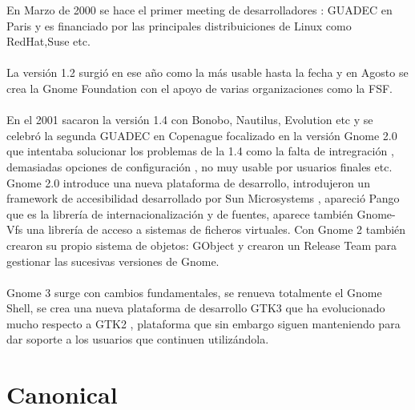 \documentclass[a4paper,oneside,11pt]{article}
\begin{document}
En Marzo de 2000 se hace el primer meeting de desarrolladores : GUADEC en Paris y
es financiado por las principales distribuiciones de Linux como RedHat,Suse etc.
\\\\
La versi\'on 1.2 surgi\'o en ese año como la m\'as usable hasta la fecha y en Agosto se crea
la Gnome Foundation con el apoyo de varias organizaciones como la FSF.
\\\\
En el 2001 sacaron la versi\'on 1.4 con Bonobo, Nautilus, Evolution etc y se celebr\'o
la segunda GUADEC en Copenague focalizado en la versi\'on Gnome 2.0 que intentaba solucionar
los problemas de la 1.4 como la falta de intregraci\'on , demasiadas opciones de configuraci\'on
, no muy usable por usuarios finales etc. Gnome 2.0 introduce una nueva plataforma de
desarrollo, introdujeron un framework de accesibilidad desarrollado por Sun Microsystems
, apareci\'o Pango que es la librer\'ia de internacionalizaci\'on y de fuentes,
aparece tambi\'en Gnome-Vfs una librer\'ia de acceso a sistemas de ficheros virtuales. 
Con Gnome 2 tambi\'en crearon su propio sistema de objetos: GObject y crearon un
Release Team para gestionar las sucesivas versiones de Gnome.
\\\\
Gnome 3 surge con cambios fundamentales, se renueva totalmente el Gnome Shell, 
se crea una nueva plataforma de desarrollo GTK3 que ha evolucionado mucho respecto
a GTK2 , plataforma que sin embargo siguen manteniendo para dar soporte a los usuarios
que continuen utiliz\'andola. 

\section{Canonical}
\end{document}
